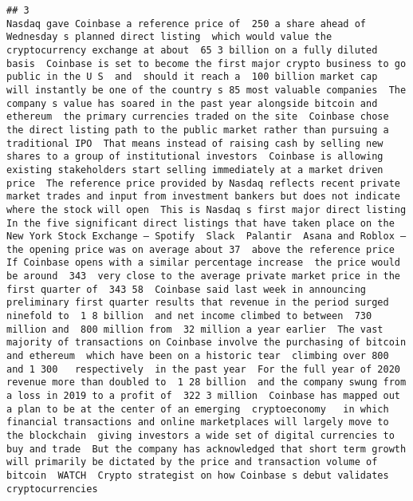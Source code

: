 \documentclass[
]{article}
\begin{document}
\begin{verbatim}
## 3                                                                                                                                                                                               Nasdaq gave Coinbase a reference price of  250 a share ahead of Wednesday s planned direct listing  which would value the cryptocurrency exchange at about  65 3 billion on a fully diluted basis  Coinbase is set to become the first major crypto business to go public in the U S  and  should it reach a  100 billion market cap  will instantly be one of the country s 85 most valuable companies  The company s value has soared in the past year alongside bitcoin and ethereum  the primary currencies traded on the site  Coinbase chose the direct listing path to the public market rather than pursuing a traditional IPO  That means instead of raising cash by selling new shares to a group of institutional investors  Coinbase is allowing existing stakeholders start selling immediately at a market driven price  The reference price provided by Nasdaq reflects recent private market trades and input from investment bankers but does not indicate where the stock will open  This is Nasdaq s first major direct listing  In the five significant direct listings that have taken place on the New York Stock Exchange — Spotify  Slack  Palantir  Asana and Roblox — the opening price was on average about 37  above the reference price  If Coinbase opens with a similar percentage increase  the price would be around  343  very close to the average private market price in the first quarter of  343 58  Coinbase said last week in announcing preliminary first quarter results that revenue in the period surged ninefold to  1 8 billion  and net income climbed to between  730 million and  800 million from  32 million a year earlier  The vast majority of transactions on Coinbase involve the purchasing of bitcoin and ethereum  which have been on a historic tear  climbing over 800  and 1 300   respectively  in the past year  For the full year of 2020  revenue more than doubled to  1 28 billion  and the company swung from a loss in 2019 to a profit of  322 3 million  Coinbase has mapped out a plan to be at the center of an emerging  cryptoeconomy   in which financial transactions and online marketplaces will largely move to the blockchain  giving investors a wide set of digital currencies to buy and trade  But the company has acknowledged that short term growth will primarily be dictated by the price and transaction volume of bitcoin  WATCH  Crypto strategist on how Coinbase s debut validates cryptocurrencies

\end{verbatim}
\end{document}
